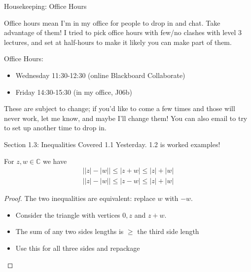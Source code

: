 \documentclass{beamer}
\newcommand{\C}{\mathbb{C}}
\begin{document}

  \begin{frame}{Housekeeping: Office Hours}

Office hours mean I'm in my office for people to drop in and chat.  Take advantage of them!  I tried to pick office hours with few/no clashes with level 3 lectures, and set at half-hours to make it likely you can make part of them.

\begin{block}{Office Hours:}
\begin{itemize}
\item Wednesday 11:30-12:30 (online Blackboard Collaborate)
  \item Friday 14:30-15:30 (in my office, J06b)
\end{itemize}
\end{block}

These are subject to change; if you'd like to come a few times and those will never work, let me know, and maybe I'll change them!  You can also email to try to set up another time to drop in.

\end{frame}


\begin{frame}{Section 1.3: Inequalities}
Covered 1.1 Yesterday.  1.2 is worked examples!
\begin{lemma}For $z,w\in\C$ we have
\begin{eqnarray*}
\big| |z|-|w|\big| \leq |z+w| \leq |z|+|w| \\
\big| |z|-|w|\big| \leq |z-w| \leq |z|+|w| 
\end{eqnarray*}

\end{lemma}
 \begin{proof}
 The two inequalities are equivalent:  replace $w$ with $-w$.
 \begin{itemize}
     \item Consider the triangle with vertices $0, z$ and $z+w$.
     \item The sum of any two sides lengths is $\geq$ the third side length  
     \item Use this for all three sides and repackage 
\end{itemize}
 \end{proof}
  \end{frame}
\end{document}
